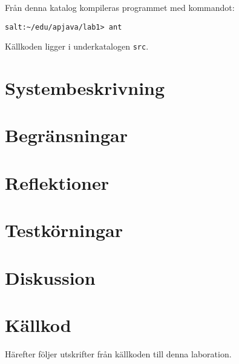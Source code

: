 \documentclass[a4paper, 12pt]{article}
\begin{document}
Från denna katalog kompileras programmet med kommandot:

\verb!salt:~/edu/apjava/lab1> ant!

Källkoden ligger i underkatalogen \verb!src!.


\section{Systembeskrivning}

\section{Begränsningar}

\section{Reflektioner}

\section{Testkörningar}

\section{Diskussion}


\newpage
\appendix
{}
\section{Källkod}
Härefter följer utskrifter från källkoden till denna laboration.

% 
\end{document}
